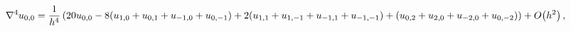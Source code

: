 \[\nabla^{4}u_{0,0}=\frac{1}{h^{4}}\,(20u_{0,0}-8(u_{1,0}+u_{0,1}+u_{-1,0}+u_{0,%
-1})+2(u_{1,1}+u_{1,-1}+u_{-1,1}+u_{-1,-1})+(u_{0,2}+u_{2,0}+u_{-2,0}+u_{0,-2}%
))+\mathop{O\/}\nolimits\!\left(h^{2}\right),\]